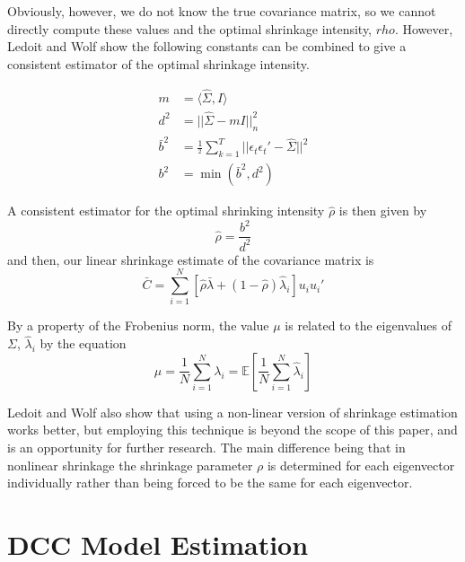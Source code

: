 \documentclass{article} %
\numberwithin{equation}{section} %
\numberwithin{figure}{section} %
\numberwithin{table}{section} %
\begin{document}
Obviously, however, we do not know the true covariance matrix, so we cannot directly compute these values and the optimal shrinkage intensity, $rho$. However, Ledoit and Wolf show the following constants can be combined to give a consistent estimator of the optimal shrinkage intensity.

\begin{align}
\nonumber
m &= \langle \hat{\Sigma}, I \rangle \\
\nonumber
d^2 &= ||\hat{\Sigma} - mI||^2_n \\
\nonumber
\bar{b}^2 &= \frac{1}{^2} \sum\limits_{k=1}^{T} ||\epsilon_t \epsilon_t' - \hat{\Sigma}||^2 \\
b^2 &= \min(\bar{b}^2, d^2)
\end{align}

A consistent estimator for the optimal shrinking intensity $\hat{\rho}$ is then given by
\begin{equation}\label{rho hat}
\hat{\rho} = \frac{b^2}{d^2}
\end{equation}
and then, our linear shrinkage estimate of the covariance matrix is
\begin{equation}
\bar{C} = \sum\limits_{i = 1}^{N}\left[ \hat{\rho}\bar{\lambda} + (1 - \hat{\rho}) \hat{\lambda}_i \right] u_i u_i'
\end{equation}


By a property of the Frobenius norm, the value $\mu$ is related to the eigenvalues of $\Sigma$, $\hat{\lambda}_i$ by the equation
\begin{equation}
\mu = \frac{1}{N} \sum\limits_{i=1}^{N} \lambda_i = \mathbb{E} \left[ \frac{1}{N} \sum\limits_{i=1}^{N} \hat{\lambda}_i \right]
\end{equation}

Ledoit and Wolf also show \cite{non-linear shrinkage} that using a non-linear version of shrinkage estimation works better, but employing this technique is beyond the scope of this paper, and is an opportunity for further research. The main difference being that in nonlinear shrinkage the shrinkage parameter $\rho$ is determined for each eigenvector individually rather than being forced to be the same for each eigenvector.


\section{DCC Model Estimation}\label{section: dcc estimation}
\end{document}
